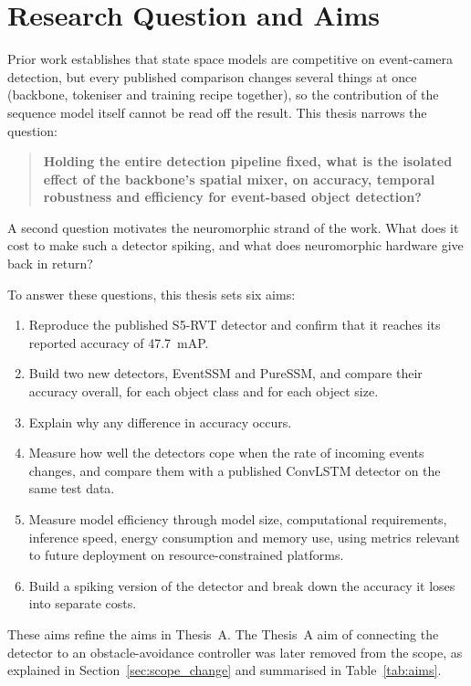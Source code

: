 \documentclass[11pt, a4paper]{report}
\begin{document}
\section{Research Question and Aims}
\label{sec:rq}
Prior work establishes that state space models are competitive on event-camera detection, but
every published comparison changes several things at once (backbone, tokeniser and training recipe together), so the contribution of the sequence model itself cannot be read off the result. This
thesis narrows the question:

\begin{quote}
\textbf{Holding the entire detection pipeline fixed, what is the isolated effect of the backbone's
spatial mixer, on accuracy, temporal robustness and efficiency
for event-based object detection?}
\end{quote}

A second question motivates the neuromorphic strand of the work. What does it cost to make such a detector spiking, and what does neuromorphic hardware give back
in return?

To answer these questions, this thesis sets six aims:
\begin{enumerate}
  \item Reproduce the published S5-RVT detector and confirm that it reaches its reported accuracy of
        47.7~mAP.
  \item Build two new detectors, EventSSM and PureSSM, and compare their accuracy overall, for each object class and for each object size.
  \item Explain why any difference in accuracy occurs.
  \item Measure how well the detectors cope when the rate of incoming events changes, and compare them with a published ConvLSTM detector on
        the same test data.
  \item Measure model efficiency through model size, computational requirements, inference speed, energy consumption and memory use, using metrics relevant to future deployment on resource-constrained platforms.
  \item Build a spiking version of the detector and break down the accuracy it loses into separate costs.
\end{enumerate}
These aims refine the aims in Thesis~A. The Thesis~A aim of connecting the detector to an
obstacle-avoidance controller was later removed from the scope, as explained in
Section~\ref{sec:scope_change} and summarised in Table~\ref{tab:aims}.
\end{document}
